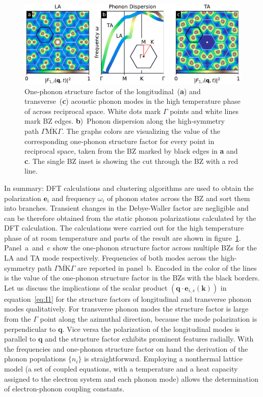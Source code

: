 \begin{figure}[!t]
	\includegraphics[width=\columnwidth]{figs/ops.pdf}
	\caption{One-phonon structure factor of the longitudinal~(\textbf{a}) and transverse~(\textbf{c}) acoustic phonon modes in the high temperature phase of \ts\space across reciprocal space. White dots mark $\Gamma$ points and white lines mark \ac{BZ} edges. \textbf{b})~Phonon dispersion along the high-symmetry path $\overline{\Gamma\mathrm{MK}\Gamma}$. The graphs colors are visualizing the value of the corresponding one-phonon structure factor for every point in reciprocal space, taken from the \ac{BZ} marked by black edges in \textbf{a} and \textbf{c}. The single \ac{BZ} inset is showing the cut through the \ac{BZ} with a red line.}
	\label{fig:ops}
\end{figure}

In summary: \Ac{DFT} calculations and clustering algorithms are used to obtain the polarization $\mathbf{e}_{i}$ and frequency $\omega_{i}$ of phonon states across the \ac{BZ} and sort them into branches.
Transient changes in the Debye-Waller factor are negligible and can be therefore obtained from the static phonon polarizations calculated by the \ac{DFT} calculation.
The calculations were carried out for the high temperature phase of \ts\space at room temperature and parts of the result are shown in figure~\ref{fig:ops}.
Panel~a~and~c show the one-phonon structure factor across multiple \acp{BZ} for the \ac{LA} and \ac{TA} mode respectively.
Frequencies of both modes across the high-symmetry path $\overline{\Gamma\mathrm{MK}\Gamma}$ are reported in panel~b.
Encoded in the color of the lines is the value of the one-phonon structure factor in the \acp{BZ} with the black borders.
Let us discuss the implications of the scalar product $\left( \mathbf{q}\cdot\mathbf{e}_{i, s}(\mathbf{k}) \right)$ in equation~\ref{eq:I1} for the structure factors of longitudinal and transverse phonon modes qualitatively.
For transverse phonon modes the structure factor is large from the $\Gamma$ point along the azimuthal direction, because the mode polarization is perpendicular to $\mathbf{q}$.
Vice versa the polarization of the longitudinal modes is parallel to $\mathbf{q}$ and the structure factor exhibits prominent features radially.
With the frequencies and one-phonon structure factor on hand the derivation of the phonon populations $\{n_{i}\}$ is straightforward.
Employing a nonthermal lattice model\cite{waldecker2016} (a set of coupled equations, with a temperature and a heat capacity assigned to the electron system and each phonon mode) allows the determination of electron-phonon coupling constants.

